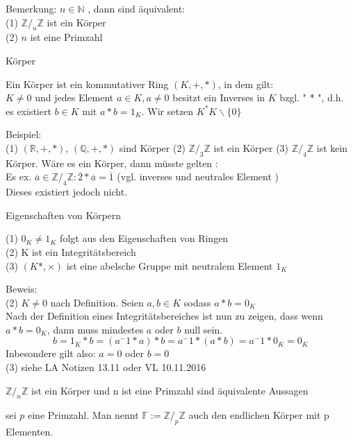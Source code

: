 \documentclass[headsepline,12pt,a4paper]{scrartcl}
\begin{document}
\item Bemerkung: $n \in \mathbb{N} $ , dann sind äquivalent:\\
(1) $ \mathbb{Z}/_n \mathbb{Z} $ ist ein Körper\\
(2) $ n $ ist eine Primzahl 

\begin{center}
\item[ Körper ]
\end{center}
\item Ein Körper ist ein kommutativer Ring $(K,+,*)$, in dem gilt: \\
$ K \neq 0 $ und jedes Element $ a \in K, a \neq 0 $ besitzt ein Inverses in $K$ bzgl. " * ", d.h. \\
es existiert $b \in K $ mit $a*b = 1_K $. Wir setzen $K^* K \backslash \{0\}$
\item Beispiel: \\
(1) $(\mathbb{R},+,*)$, $(\mathbb{Q},+,*) $ sind Körper 
(2) $\mathbb{Z}/_3 \mathbb{Z} $ ist ein Körper 
(3) $\mathbb{Z}/_4 \mathbb{Z} $ ist kein Körper. Wäre es ein Körper, dann müsste gelten : \\
Es ex. $ \overline{a} \in \mathbb{Z}/_4 \mathbb{Z} : \overline{2} * \overline{a} = \overline{1} $ (vgl. inverses und neutrales Element )\\
Dieses existiert jedoch nicht. \\

\begin{center}
\item[ Eigenschaften von Körpern ]
\end{center}
(1) $ 0_K \neq 1_K $ folgt aus den Eigenschaften von Ringen \\
(2) K ist ein Integritätsbereich \\
(3) $(K*,\times ) $ ist eine abelsche Gruppe mit neutralem Element $1_K$ \\
\item Beweis: \\
(2) $ K \neq 0 $ nach Definition. Seien $a,b \in K $ sodass $a*b = 0_K$ \\
Nach der Definition eines Integritätsbereiches ist nun zu zeigen, dass wenn $a*b = 0_K$, dann muss mindestes $a$ oder $b$ null sein.
$$ b = 1_K * b = (a^-1 * a)*b = a^-1 * (a*b) = a^-1 * 0_K = 0_K $$ 
Inbesondere gilt also: $ a=0 $ oder $ b = 0 $ \\
(3) siehe LA Notizen 13.11 oder VL 10.11.2016\\

\item $\mathbb{Z}/_n \mathbb{Z} $ ist ein Körper und n ist eine Primzahl sind äquivalente Aussagen
\item sei $p$ eine Primzahl. Man nennt $ \mathbb{F} := \mathbb{Z} /_p \mathbb{Z} $ auch den endlichen Körper mit p Elementen.
\end{document}
